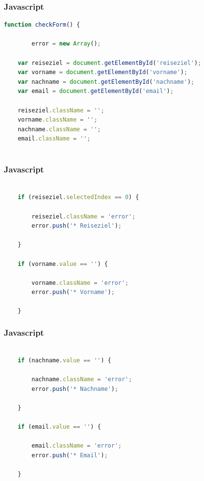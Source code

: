 \documentclass[xcolor=dvipsnames]{beamer}
\begin{document}
\begin{frame}[fragile]
\frametitle{Javascript}

\begin{lstlisting}[language=javascript]
function checkForm() {

		error = new Array();

	var reiseziel = document.getElementById('reiseziel');
	var vorname = document.getElementById('vorname');
	var nachname = document.getElementById('nachname');
	var email = document.getElementById('email');

	reiseziel.className = '';
	vorname.className = '';
	nachname.className = '';
	email.className = '';
	


\end{lstlisting}
\end{frame}

\begin{frame}[fragile]
\frametitle{Javascript}

\begin{lstlisting}[language=javascript, firstnumber=14]
	
	if (reiseziel.selectedIndex == 0) {

		reiseziel.className = 'error';
		error.push('* Reiseziel');

	}

	if (vorname.value == '') {

		vorname.className = 'error';
		error.push('* Vorname');

	}


\end{lstlisting}
\end{frame}

\begin{frame}[fragile]
\frametitle{Javascript}

\begin{lstlisting}[language=javascript, firstnumber=28]

	if (nachname.value == '') {

		nachname.className = 'error';
		error.push('* Nachname');

	}

	if (email.value == '') {

		email.className = 'error';
		error.push('* Email');

	}


\end{lstlisting}
\end{frame}
\end{document}
